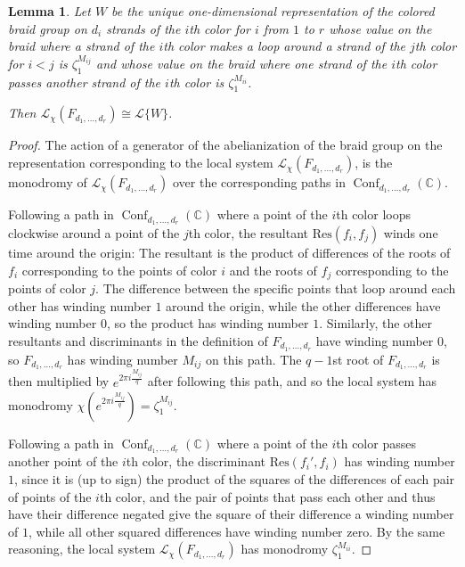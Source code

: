 \documentclass[11pt,letterpaper]{article}
\newtheorem{lemma}[theorem]{Lemma}
\theoremstyle{definition}
\theoremstyle{remark}
\numberwithin{equation}{section}
\theoremstyle{dotless}
\newcommand{\gene}{\zeta_1} %
\newcommand{\Res}{{\mathrm{Res}}}
\begin{document}
\begin{lemma}\label{colored-braid-calculation} Let $W$ be the unique one-dimensional representation of the colored braid group on  $d_i$ strands of the $i$th color for $i$ from $1$ to $r$ whose value on the braid where a strand of the $i$th color makes a loop around a strand of the $j$th color for $i<j$ is $\gene^{M_{ij}}$ and whose value on the braid where one strand of the $i$th color passes another strand of the $i$th color is $\gene^{M_{ii}}$.

Then $\mathcal L_\chi (F_{d_1,\dots, d_r}) \cong \mathcal L\{W\}$. \end{lemma}

\begin{proof} The action of a generator of the abelianization of the braid group on the representation corresponding to the local system $\mathcal L_{\chi}(F_{d_1,\dots, d_r})$, is the monodromy of $\mathcal L_{\chi}(F_{d_1,\dots, d_r})$ over the corresponding paths in $\operatorname{Conf}_{d_1,\dots, d_r} (\mathbb C) $.

Following a path in $\operatorname{Conf}_{d_1,\dots, d_r} (\mathbb C) $ where a point of the $i$th color loops clockwise around a point of the $j$th color, the resultant $\Res(f_i,f_j)$ winds one time around the origin: The resultant is the product of differences of the roots of $f_i$ corresponding to the points of color $i$ and the roots of $f_j$ corresponding to the points of color $j$. The difference between the specific points that loop around each other has winding number $1$ around the origin, while the other differences have winding number $0$, so the product has winding number $1$. Similarly, the other resultants and discriminants in the definition of $F_{d_1,\dots, d_r}$ have winding number $0$, so $F_{d_1,\dots,d_r}$ has winding number $M_{ij}$ on this path. The $q-1$st root of $F_{d_1,\dots, d_r}$ is then multiplied by $e^{2\pi i \frac{M_{ij}}{q}} $ after following this path, and so the local system has monodromy $\chi ( e^{2\pi i \frac{M_{ij}}{q}}) =\gene^{M_{ij}}$.

Following a path in $\operatorname{Conf}_{d_1,\dots, d_r} (\mathbb C) $ where a point of the $i$th color passes another point of the $i$th color, the discriminant $\Res(f_i',f_i)$ has winding number $1$, since it is (up to sign) the product of the squares of the differences of each pair of points of the $i$th color, and the pair of points that pass each other and thus have their difference negated give the square of their difference a winding number of $1$, while all other squared differences have winding number zero. By the same reasoning, the local system $\mathcal L_\chi( F_{d_1,\dots, d_r})$ has monodromy $\gene^{M_{ii}}$. \end{proof}
\end{document}
